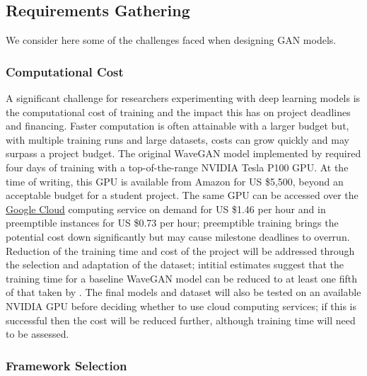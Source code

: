 \documentclass[a4paper, dvipsnames, titlepage]{article}
\begin{document}
\subsection{Requirements Gathering}

We consider here some of the challenges faced when designing GAN models.

\subsubsection{Computational Cost}

A significant challenge for researchers experimenting with deep learning models is the computational cost of training and the impact this has on project deadlines and financing.
Faster computation is often attainable with a larger budget but, with multiple training runs and large datasets, costs can grow quickly and may surpass a project budget.
\newline
\newline
The original WaveGAN model implemented by \citeauthor{2018arXiv180204208D} required four days of training with a top-of-the-range NVIDIA Tesla P100 GPU.
At the time of writing, this GPU is available from Amazon for US \$5,500, beyond an acceptable budget for a student project.
The same GPU can be accessed over the \href{https://cloud.google.com/gpu/}{Google Cloud} computing service on demand for US \$1.46 per hour and in preemptible instances for US \$0.73 per hour; preemptible training brings the potential cost down significantly but may cause milestone deadlines to overrun.
\newline
\newline
Reduction of the training time and cost of the project will be addressed through the selection and adaptation of the dataset; intitial estimates suggest that the training time for a baseline WaveGAN model can be reduced to at least one fifth of that taken by \citeauthor{2018arXiv180204208D}.
The final models and dataset will also be tested on an available NVIDIA GPU before deciding whether to use cloud computing services; if this is successful then the cost will be reduced further, although training time will need to be assessed.

\subsubsection{Framework Selection}
\end{document}
